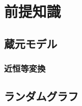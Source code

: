 \documentclass[../main]{subfiles}
\begin{document}
\chapter{前提知識}
\section{蔵元モデル}
\subsection{近恒等変換}
\section{ランダムグラフ}
\end{document}
